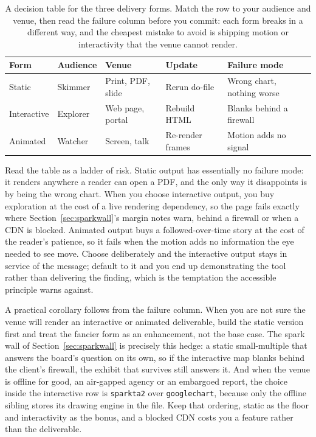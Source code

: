 \documentclass[
    a4paper,
    fontsize=10pt,
    twoside=true,
    numbers=noenddot,
]{kaobook}
\begin{document}
\begin{table}[htbp]
\centering
\caption[Choosing static, interactive, or animated]{A decision table for the three delivery forms. Match the row to your audience and venue, then read the failure column before you commit: each form breaks in a different way, and the cheapest mistake to avoid is shipping motion or interactivity that the venue cannot render.}
\label{tab:interactive-choice}
{\footnotesize
\begin{tabular}{@{}llllp{6.0cm}@{}}
\hline
Form & Audience & Venue & Update & Failure mode \\
\hline
Static & Skimmer & Print, PDF, slide & Rerun do-file & Wrong chart, nothing worse \\
Interactive & Explorer & Web page, portal & Rebuild HTML & Blanks behind a firewall \\
Animated & Watcher & Screen, talk & Re-render frames & Motion adds no signal \\
\hline
\end{tabular}
}
\end{table}

Read the table as a ladder of risk. Static output has essentially no failure mode: it renders anywhere a reader can open a PDF, and the only way it disappoints is by being the wrong chart. When you choose interactive output, you buy exploration at the cost of a live rendering dependency, so the page fails exactly where Section~\ref{sec:sparkwall}'s margin notes warn, behind a firewall or when a CDN is blocked. Animated output buys a followed-over-time story at the cost of the reader's patience, so it fails when the motion adds no information the eye needed to see move. Choose deliberately and the interactive output stays in service of the message; default to it and you end up demonstrating the tool rather than delivering the finding, which is the temptation the accessible principle warns against.

A practical corollary follows from the failure column. When you are not sure the venue will render an interactive or animated deliverable, build the static version first and treat the fancier form as an enhancement, not the base case. The spark wall of Section~\ref{sec:sparkwall} is precisely this hedge: a static small-multiple that answers the board's question on its own, so if the interactive map blanks behind the client's firewall, the exhibit that survives still answers it. And when the venue is offline for good, an air-gapped agency or an embargoed report, the choice inside the interactive row is \texttt{sparkta2} over \texttt{googlechart}, because only the offline sibling stores its drawing engine in the file. Keep that ordering, static as the floor and interactivity as the bonus, and a blocked CDN costs you a feature rather than the deliverable.
\end{document}
